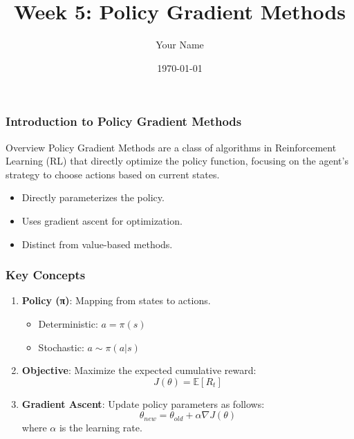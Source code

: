\documentclass{beamer}
\title{Week 5: Policy Gradient Methods}
\author{Your Name}
\institute{Your Institution}
\date{\today}
\begin{document}
\frame{\titlepage}

\begin{frame}[fragile]
    \frametitle{Introduction to Policy Gradient Methods}
    
    \begin{block}{Overview}
        Policy Gradient Methods are a class of algorithms in Reinforcement Learning (RL) that directly optimize the policy function, focusing on the agent's strategy to choose actions based on current states.
    \end{block}
    
    \begin{itemize}
        \item Directly parameterizes the policy.
        \item Uses gradient ascent for optimization.
        \item Distinct from value-based methods.
    \end{itemize}
\end{frame}

\begin{frame}[fragile]
    \frametitle{Key Concepts}
    
    \begin{enumerate}
        \item \textbf{Policy (π)}: Mapping from states to actions.
            \begin{itemize}
                \item Deterministic: \( a = \pi(s) \)
                \item Stochastic: \( a \sim \pi(a | s) \)
            \end{itemize}
        
        \item \textbf{Objective}: Maximize the expected cumulative reward:
            \begin{equation}
                J(\theta) = \mathbb{E}[R_t]
            \end{equation}
        
        \item \textbf{Gradient Ascent}: Update policy parameters as follows:
            \begin{equation}
                \theta_{new} = \theta_{old} + \alpha \nabla J(\theta)
            \end{equation}
            where \( \alpha \) is the learning rate.
    \end{enumerate}
\end{frame}
\end{document}
